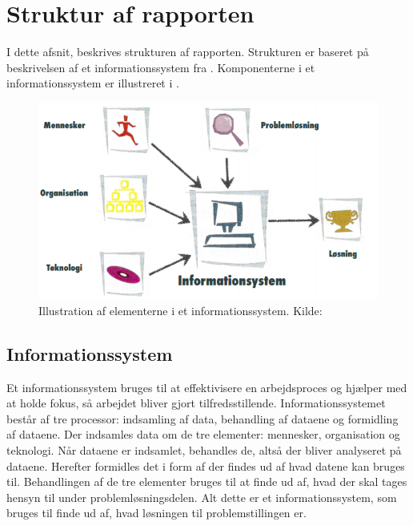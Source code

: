 \section{Struktur af rapporten}\label{sec:struktur-af-problemanalyse}

I dette afsnit, beskrives strukturen af rapporten. Strukturen er baseret på beskrivelsen af et
informationssystem fra \citet{Laudon1999}. Komponenterne i et informationssystem er illustreret i
.

\begin{figure}[htbp]
  \centering
  \includegraphics{images/kontekstmodel/metode.png}
  \caption[Metode for Kontekstmodellen]{Illustration af elementerne i et informationssystem. Kilde:
  \protect\citet{Laudon1999}}
  \label{fig:kontekstmodel}
\end{figure}


\subsection{Informationssystem}\label{subsec:Informationssystem}

Et informationssystem bruges til at effektivisere en arbejdsproces og hjælper med at holde fokus, så arbejdet
bliver gjort tilfredsstillende. Informationssystemet består af tre processor: indsamling af data, behandling
af dataene og formidling af dataene. Der indsamles data om de tre elementer: mennesker, organisation og
teknologi. Når dataene er indsamlet, behandles de, altså der bliver analyseret på dataene. Herefter formidles
det i form af der findes ud af hvad datene kan bruges til. Behandlingen af de tre elementer bruges til at
finde ud af, hvad der skal tages hensyn til under problemløsningsdelen. Alt dette er et informationssystem,
som bruges til finde ud af, hvad løsningen til problemstillingen er.


